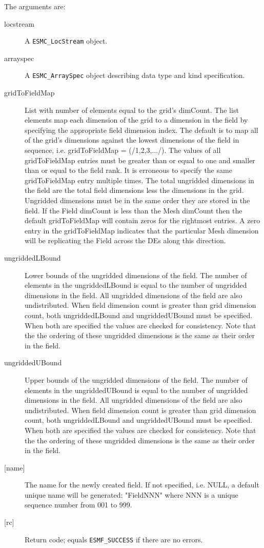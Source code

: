     The arguments are:
    \begin{description}
    \item[locstream]
      A {\tt ESMC\_LocStream} object.
    \item[arrayspec]
      A {\tt ESMC\_ArraySpec} object describing data type and kind specification.
    \item[gridToFieldMap]
      List with number of elements equal to the grid's dimCount. The list
      elements map each dimension of the grid to a dimension in the field by
      specifying the appropriate field dimension index. The default is to map all of
      the grid's dimensions against the lowest dimensions of the field in sequence,
      i.e. gridToFieldMap = (/1,2,3,.../). The values of all gridToFieldMap entries
      must be greater than or equal to one and smaller than or equal to the field
      rank. It is erroneous to specify the same gridToFieldMap entry multiple times.
      The total ungridded dimensions in the field  are the total field dimensions
      less the dimensions in the grid. Ungridded dimensions must be in the same order
      they are stored in the field. If the Field dimCount is less than the Mesh
      dimCount then the default gridToFieldMap will contain zeros for the rightmost
      entries. A zero entry in the gridToFieldMap indicates that the particular Mesh
      dimension will be replicating the Field across the DEs along this direction.
    \item[ungriddedLBound]
      Lower bounds of the ungridded dimensions of the field. The number of elements
      in the ungriddedLBound is equal to the number of ungridded dimensions in the
      field. All ungridded dimensions of the field are also undistributed. When field
      dimension count is greater than grid dimension count, both ungriddedLBound and
      ungriddedUBound must be specified. When both are specified the values are
      checked for consistency. Note that the the ordering of these ungridded
      dimensions is the same as their order in the field.  
    \item[ungriddedUBound]
      Upper bounds of the ungridded dimensions of the field. The number of elements
      in the ungriddedUBound is equal to the number of ungridded dimensions in the
      field. All ungridded dimensions of the field are also undistributed. When field
      dimension count is greater than grid dimension count, both ungriddedLBound and
      ungriddedUBound must be specified. When both are specified the values are
      checked for consistency. Note that the the ordering of these ungridded
      dimensions is the same as their order in the field.  
    \item[{[name]}]
      The name for the newly created field.  If not specified, i.e. NULL,
      a default unique name will be generated: "FieldNNN" where NNN
      is a unique sequence number from 001 to 999.
    \item[{[rc]}]
      Return code; equals {\tt ESMF\_SUCCESS} if there are no errors.
    \end{description}
   
